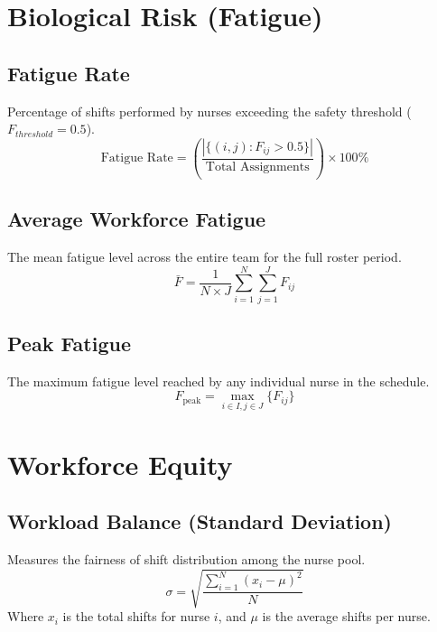 \documentclass{article}
\begin{document}
\section{Biological Risk (Fatigue)}

\subsection{Fatigue Rate}
Percentage of shifts performed by nurses exceeding the safety threshold ($F_{threshold} = 0.5$).
\begin{equation}
\text{Fatigue Rate} = \left( \frac{|\{ (i,j) : F_{ij} > 0.5 \}|}{\text{Total Assignments}} \right) \times 100\%
\end{equation}

\subsection{Average Workforce Fatigue}
The mean fatigue level across the entire team for the full roster period.
\begin{equation}
\bar{F} = \frac{1}{N \times J} \sum_{i=1}^{N} \sum_{j=1}^{J} F_{ij}
\end{equation}

\subsection{Peak Fatigue}
The maximum fatigue level reached by any individual nurse in the schedule.
\begin{equation}
F_{\text{peak}} = \max_{i \in I, j \in J} \{ F_{ij} \}
\end{equation}

\section{Workforce Equity}

\subsection{Workload Balance (Standard Deviation)}
Measures the fairness of shift distribution among the nurse pool.
\begin{equation}
\sigma = \sqrt{\frac{\sum_{i=1}^{N} (x_i - \mu)^2}{N}}
\end{equation}
Where $x_i$ is the total shifts for nurse $i$, and $\mu$ is the average shifts per nurse.
\end{document}
